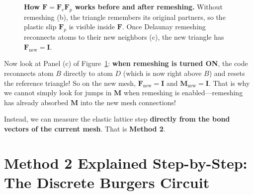 \documentclass[11pt,a4paper]{article}
\begin{document}
\begin{figure}[htbp]
  \caption{\textbf{How $\bm{F} = \bm{F}_e \bm{F}_p$ works before and after remeshing.} Without remeshing (b), the triangle remembers its original partners, so the plastic slip $\bm{F}_p$ is visible inside $\bm{F}$. Once Delaunay remeshing reconnects atoms to their new neighbors (c), the new triangle has $\bm{F}_{\mathrm{new}} = \bm{I}$.}
  \label{fig:FeFp}
\end{figure}

Now look at Panel (c) of Figure~\ref{fig:FeFp}: \textbf{when remeshing is turned ON}, the code
reconnects atom $B$ directly to atom $D$ (which is now right above $B$) and resets the reference
triangle! So on the new mesh, $\bm{F}_{\mathrm{new}} = \bm{I}$ and $\bm{M}_{\mathrm{new}} = \bm{I}$.
That is why we cannot simply look for jumps in $\bm{M}$ when remeshing is enabled---remeshing has
already absorbed $\bm{M}$ into the new mesh connections!

Instead, we can measure the elastic lattice step \textbf{directly from the bond vectors of the
current mesh}. That is \textbf{Method 2}.

\section{Method 2 Explained Step-by-Step: The Discrete Burgers Circuit}
\end{document}
